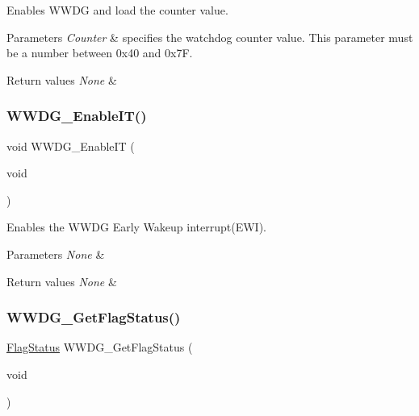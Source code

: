 Enables W\+W\+DG and load the counter value. 


\begin{DoxyParams}{Parameters}
{\em Counter} & specifies the watchdog counter value. This parameter must be a number between 0x40 and 0x7F. \\
\hline
\end{DoxyParams}

\begin{DoxyRetVals}{Return values}
{\em None} & \\
\hline
\end{DoxyRetVals}
\mbox{\label{group___w_w_d_g___exported___functions_gac8af66ea5254d3d78b60b9b7c7f29521}} 
\subsubsection{\texorpdfstring{WWDG\_EnableIT()}{WWDG\_EnableIT()}}
{\footnotesize\ttfamily void W\+W\+D\+G\+\_\+\+Enable\+IT (\begin{DoxyParamCaption}\item[{void}]{ }\end{DoxyParamCaption})}



Enables the W\+W\+DG Early Wakeup interrupt(\+E\+W\+I). 


\begin{DoxyParams}{Parameters}
{\em None} & \\
\hline
\end{DoxyParams}

\begin{DoxyRetVals}{Return values}
{\em None} & \\
\hline
\end{DoxyRetVals}
\mbox{\label{group___w_w_d_g___exported___functions_ga7df4882d45918b9b8249dfca1e44fabc}} 
\subsubsection{\texorpdfstring{WWDG\_GetFlagStatus()}{WWDG\_GetFlagStatus()}}
{\footnotesize\ttfamily \mbox{\hyperlink{group___exported__types_ga89136caac2e14c55151f527ac02daaff}{Flag\+Status}} W\+W\+D\+G\+\_\+\+Get\+Flag\+Status (\begin{DoxyParamCaption}\item[{void}]{ }\end{DoxyParamCaption})}



